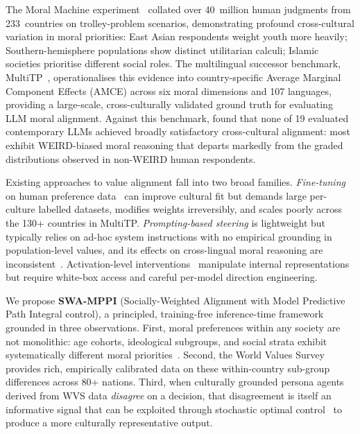 \documentclass{article}
\begin{document}
The Moral Machine experiment~\citep{awad2018moral} collated over 40~million human
judgments from 233~countries on trolley-problem scenarios, demonstrating profound
cross-cultural variation in moral priorities: East Asian respondents weight youth more
heavily; Southern-hemisphere populations show distinct utilitarian calculi; Islamic
societies prioritise different social roles. The multilingual successor benchmark,
MultiTP~\citep{jin2025multitp}, operationalises this evidence into country-specific
Average Marginal Component Effects (AMCE) across six moral dimensions and 107 languages,
providing a large-scale, cross-culturally validated ground truth for evaluating LLM moral
alignment. Against this benchmark, \citet{jin2025multitp} found that none of 19 evaluated
contemporary LLMs achieved broadly satisfactory cross-cultural alignment: most exhibit
WEIRD-biased moral reasoning that departs markedly from the graded distributions observed
in non-WEIRD human respondents.

Existing approaches to value alignment fall into two broad families. \emph{Fine-tuning}
on human preference data~\citep{bai2022constitutional, ouyang2022instructgpt} can improve
cultural fit but demands large per-culture labelled datasets, modifies weights irreversibly,
and scales poorly across the 130+ countries in MultiTP. \emph{Prompting-based steering}
is lightweight but typically relies on ad-hoc system instructions with no empirical grounding
in population-level values, and its effects on cross-lingual moral reasoning are
inconsistent~\citep{jin2025multitp}. Activation-level interventions~\citep{arditi2025refusal,
zou2023representation} manipulate internal representations but require white-box access and
careful per-model direction engineering.

We propose \textbf{SWA-MPPI} (Socially-Weighted Alignment with Model Predictive Path
Integral control), a principled, training-free inference-time framework grounded in three
observations. First, moral preferences within any society are not monolithic: age cohorts,
ideological subgroups, and social strata exhibit systematically different moral
priorities~\citep{awad2018moral, kleiman2017learning}. Second, the World Values
Survey~\citep{haerpfer2022wvs} provides rich, empirically calibrated data on these
within-country sub-group differences across 80+ nations. Third, when culturally grounded
persona agents derived from WVS data \emph{disagree} on a decision, that disagreement is
itself an informative signal that can be exploited through stochastic optimal
control~\citep{williams2017mppi} to produce a more culturally representative output.
\end{document}
